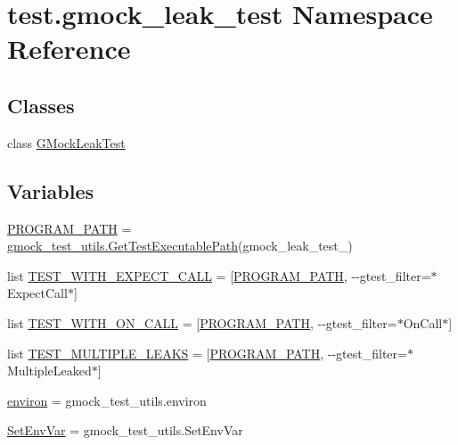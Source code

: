 \hypertarget{namespacetest_1_1gmock__leak__test}{}\section{test.\+gmock\+\_\+leak\+\_\+test Namespace Reference}
\label{namespacetest_1_1gmock__leak__test}
\subsection*{Classes}
\begin{DoxyCompactItemize}
\item 
class \mbox{\hyperlink{classtest_1_1gmock__leak__test_1_1_g_mock_leak_test}{G\+Mock\+Leak\+Test}}
\end{DoxyCompactItemize}
\subsection*{Variables}
\begin{DoxyCompactItemize}
\item 
\mbox{\hyperlink{namespacetest_1_1gmock__leak__test_a9ed7230f000e029711f6abedc071cedb}{P\+R\+O\+G\+R\+A\+M\+\_\+\+P\+A\+TH}} = \mbox{\hyperlink{namespacetest_1_1gmock__test__utils_a2e91ced571e7f160fc151c2378d8f2f1}{gmock\+\_\+test\+\_\+utils.\+Get\+Test\+Executable\+Path}}(\textquotesingle{}gmock\+\_\+leak\+\_\+test\+\_\+\textquotesingle{})
\item 
list \mbox{\hyperlink{namespacetest_1_1gmock__leak__test_a56df84ecc7d36433c839cf3e37af22af}{T\+E\+S\+T\+\_\+\+W\+I\+T\+H\+\_\+\+E\+X\+P\+E\+C\+T\+\_\+\+C\+A\+LL}} = \mbox{[}\mbox{\hyperlink{namespacetest_1_1gmock__leak__test_a9ed7230f000e029711f6abedc071cedb}{P\+R\+O\+G\+R\+A\+M\+\_\+\+P\+A\+TH}}, \textquotesingle{}-\/-\/gtest\+\_\+filter=$\ast$Expect\+Call$\ast$\textquotesingle{}\mbox{]}
\item 
list \mbox{\hyperlink{namespacetest_1_1gmock__leak__test_a0e072351d23a6afcf62cde9c1be0e46d}{T\+E\+S\+T\+\_\+\+W\+I\+T\+H\+\_\+\+O\+N\+\_\+\+C\+A\+LL}} = \mbox{[}\mbox{\hyperlink{namespacetest_1_1gmock__leak__test_a9ed7230f000e029711f6abedc071cedb}{P\+R\+O\+G\+R\+A\+M\+\_\+\+P\+A\+TH}}, \textquotesingle{}-\/-\/gtest\+\_\+filter=$\ast$On\+Call$\ast$\textquotesingle{}\mbox{]}
\item 
list \mbox{\hyperlink{namespacetest_1_1gmock__leak__test_aa23c1c807b2032db496a705b4cd7ff3b}{T\+E\+S\+T\+\_\+\+M\+U\+L\+T\+I\+P\+L\+E\+\_\+\+L\+E\+A\+KS}} = \mbox{[}\mbox{\hyperlink{namespacetest_1_1gmock__leak__test_a9ed7230f000e029711f6abedc071cedb}{P\+R\+O\+G\+R\+A\+M\+\_\+\+P\+A\+TH}}, \textquotesingle{}-\/-\/gtest\+\_\+filter=$\ast$Multiple\+Leaked$\ast$\textquotesingle{}\mbox{]}
\item 
\mbox{\hyperlink{namespacetest_1_1gmock__leak__test_aa36886cd031cc149c0791986e85fd6de}{environ}} = gmock\+\_\+test\+\_\+utils.\+environ
\item 
\mbox{\hyperlink{namespacetest_1_1gmock__leak__test_aeb3d543c20213cdbf449bd4ff1a4fb55}{Set\+Env\+Var}} = gmock\+\_\+test\+\_\+utils.\+Set\+Env\+Var
\end{DoxyCompactItemize}


